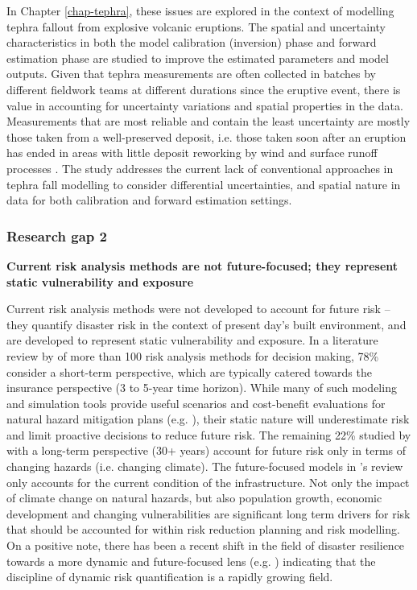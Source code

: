 In Chapter \ref{chap-tephra}, these issues are explored in the context of modelling tephra fallout from explosive volcanic eruptions. The spatial and uncertainty characteristics in both the model calibration (inversion) phase and forward estimation phase are studied to improve the estimated parameters and model outputs. Given that tephra measurements are often collected in batches by different fieldwork teams at different durations since the eruptive event, there is value in accounting for uncertainty variations and spatial properties in the data. Measurements that are most reliable and contain the least uncertainty are mostly those taken from a well-preserved deposit, i.e. those taken soon after an eruption has ended in areas with little deposit reworking by wind and surface runoff processes \citep{PYLE201625, blong2017}. The study addresses the current lack of conventional approaches in tephra fall modelling to consider differential uncertainties, and spatial nature in data for both calibration and forward estimation settings.


\subsubsection{Research gap 2}
    
\textbf{Current risk analysis methods are not future-focused; they represent static vulnerability and exposure} 

Current risk analysis methods were not developed to account for future risk -- they quantify disaster risk in the context of present day's built environment, and are developed to represent static vulnerability and exposure. In a literature review by \citet{newman2017review} of more than 100 risk analysis methods for decision making, 78\% consider a short-term perspective, which are typically catered towards the insurance perspective (3 to 5-year time horizon). While many of such modeling and simulation tools provide useful scenarios and cost-benefit evaluations for natural hazard mitigation plans (e.g. \citet{mostafavi2021toward, nofal2021high, talebiyan2018risk, wang2020computational}), their static nature will underestimate risk and limit proactive decisions to reduce future risk. The remaining 22\% studied by \citet{newman2017review} with a long-term perspective (30+ years) account for future risk only in terms of changing hazards (i.e. changing climate). The future-focused models in \citet{newman2017review}'s review only accounts for the current condition of the infrastructure. Not only the impact of climate change on natural hazards, but also population growth, economic development and changing vulnerabilities are significant long term drivers for risk that should be accounted for within risk reduction planning and risk modelling. On a positive note, there has been a recent shift in the field of disaster resilience towards a more dynamic and future-focused lens (e.g. \citet{cremen2021modelling, galasso2021risk, hemmati2020role, sanderson2022coupled}) indicating that the discipline of dynamic risk quantification is a rapidly growing field.

